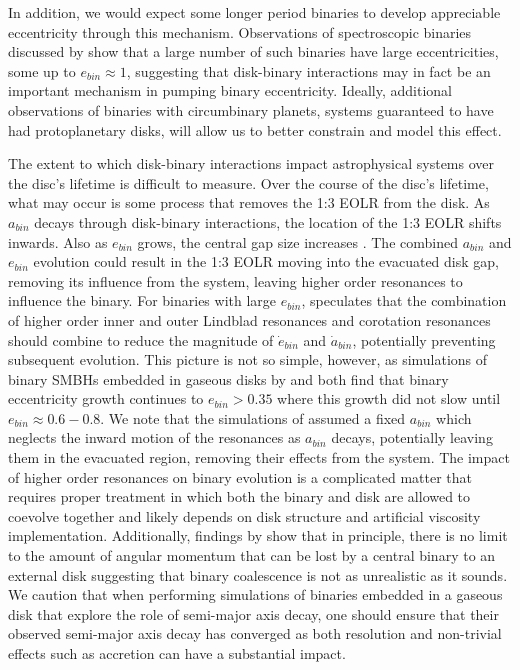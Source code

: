 In addition, we would expect some longer period binaries to develop appreciable eccentricity through this mechanism.  Observations of spectroscopic binaries discussed by \citet{Mazeh2008} show that a large number of such binaries have large eccentricities, some up to $e_{bin} \approx 1$, suggesting that disk-binary interactions may in fact be an important mechanism in pumping binary eccentricity.  Ideally, additional observations of binaries with circumbinary planets, systems guaranteed to have had protoplanetary disks, will allow us to better constrain and model this effect.

The extent to which disk-binary interactions impact astrophysical systems over the disc's lifetime is difficult to measure.  Over the course of the disc's 
lifetime, what may occur is some process that removes the 1:3 EOLR from the disk.  As $a_{bin}$ decays through disk-binary interactions, the location of the 
1:3 EOLR shifts inwards.  Also as $e_{bin}$ grows, the central gap size increases \citep{Artymowicz1994}.  The combined $a_{bin}$ and $e_{bin}$ evolution could result 
in the 1:3 EOLR moving into the evacuated disk gap, removing its influence from the system, leaving higher order resonances to influence the binary.  For 
binaries with large $e_{bin}$, \citet{Artymowicz1991} speculates that the combination of higher order inner and outer Lindblad resonances and corotation resonances 
should combine to reduce the magnitude of $\dot{e}_{bin}$ and $\dot{a}_{bin}$, potentially preventing subsequent evolution.  This picture is not so 
simple, however, as simulations of binary SMBHs embedded in gaseous disks by \citet{Cuadra2009} and \citet{Roedig2011} both find that binary eccentricity growth 
continues to $e_{bin} > 0.35$ where this growth did not slow until $e_{bin} \approx 0.6-0.8$.  We note that the simulations of \citet{Roedig2011} assumed a fixed 
$a_{bin}$ which neglects the inward motion of the resonances as $a_{bin}$ decays, potentially leaving them in the evacuated region, removing their effects 
from the system.  The impact of higher order resonances on binary evolution is a complicated matter that requires proper treatment in which both the binary and 
disk are allowed to coevolve together and likely depends on disk structure and artificial viscosity implementation.  Additionally, findings by \citet{Pringle1991} show 
that in principle, there is no limit to the amount of angular momentum that can be lost by a central binary to an external disk suggesting that binary coalescence 
is not as unrealistic as it sounds.   We caution that when performing simulations of binaries embedded in a gaseous disk that explore the role of semi-major axis decay, one should ensure that their observed semi-major axis decay has converged as both resolution and non-trivial effects such as accretion \citep[e.g.][]{Roedig2012} can have a substantial impact.

